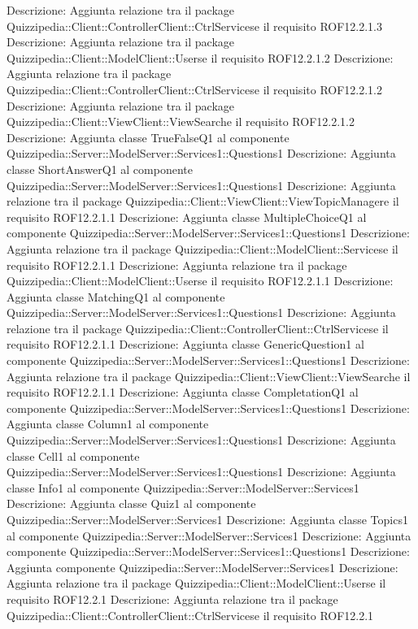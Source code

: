 Descrizione: Aggiunta relazione tra il package Quizzipedia::Client::ControllerClient::CtrlServicese il requisito ROF12.2.1.3 
Descrizione: Aggiunta relazione tra il package Quizzipedia::Client::ModelClient::Userse il requisito ROF12.2.1.2 
Descrizione: Aggiunta relazione tra il package Quizzipedia::Client::ControllerClient::CtrlServicese il requisito ROF12.2.1.2 
Descrizione: Aggiunta relazione tra il package Quizzipedia::Client::ViewClient::ViewSearche il requisito ROF12.2.1.2 
Descrizione: Aggiunta classe TrueFalseQ1 al componente Quizzipedia::Server::ModelServer::Services1::Questions1 
Descrizione: Aggiunta classe ShortAnswerQ1 al componente Quizzipedia::Server::ModelServer::Services1::Questions1 
Descrizione: Aggiunta relazione tra il package Quizzipedia::Client::ViewClient::ViewTopicManagere il requisito ROF12.2.1.1 
Descrizione: Aggiunta classe MultipleChoiceQ1 al componente Quizzipedia::Server::ModelServer::Services1::Questions1 
Descrizione: Aggiunta relazione tra il package Quizzipedia::Client::ModelClient::Servicese il requisito ROF12.2.1.1 
Descrizione: Aggiunta relazione tra il package Quizzipedia::Client::ModelClient::Userse il requisito ROF12.2.1.1 
Descrizione: Aggiunta classe MatchingQ1 al componente Quizzipedia::Server::ModelServer::Services1::Questions1 
Descrizione: Aggiunta relazione tra il package Quizzipedia::Client::ControllerClient::CtrlServicese il requisito ROF12.2.1.1 
Descrizione: Aggiunta classe GenericQuestion1 al componente Quizzipedia::Server::ModelServer::Services1::Questions1 
Descrizione: Aggiunta relazione tra il package Quizzipedia::Client::ViewClient::ViewSearche il requisito ROF12.2.1.1 
Descrizione: Aggiunta classe CompletationQ1 al componente Quizzipedia::Server::ModelServer::Services1::Questions1 
Descrizione: Aggiunta classe Column1 al componente Quizzipedia::Server::ModelServer::Services1::Questions1 
Descrizione: Aggiunta classe Cell1 al componente Quizzipedia::Server::ModelServer::Services1::Questions1 
Descrizione: Aggiunta classe Info1 al componente Quizzipedia::Server::ModelServer::Services1 
Descrizione: Aggiunta classe Quiz1 al componente Quizzipedia::Server::ModelServer::Services1 
Descrizione: Aggiunta classe Topics1 al componente Quizzipedia::Server::ModelServer::Services1 
Descrizione: Aggiunta componente Quizzipedia::Server::ModelServer::Services1::Questions1 
Descrizione: Aggiunta componente Quizzipedia::Server::ModelServer::Services1 
Descrizione: Aggiunta relazione tra il package Quizzipedia::Client::ModelClient::Userse il requisito ROF12.2.1 
Descrizione: Aggiunta relazione tra il package Quizzipedia::Client::ControllerClient::CtrlServicese il requisito ROF12.2.1 
